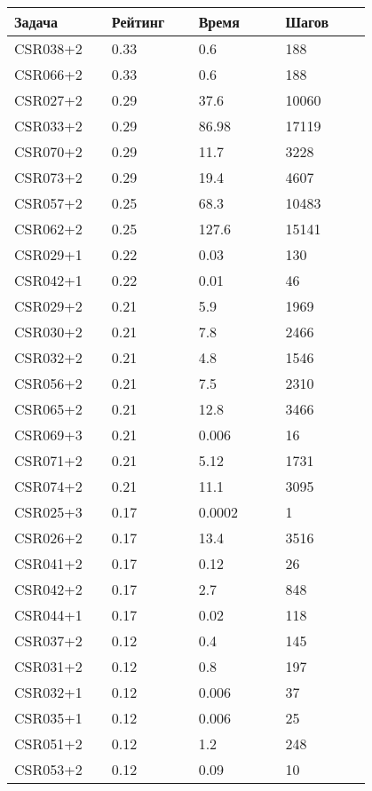 \begin{longtable}[H]{|p{0.2\linewidth}|p{0.2\linewidth}|p{0.2\linewidth}|p{0.2\linewidth}|}
\hline
\textbf{Задача} & \textbf{Рейтинг} & \textbf{Время} & \textbf{Шагов} \\
\hline
CSR038+2 &  0.33 &  0.6 &  188 \\
\hline
CSR066+2 &  0.33 &  0.6 &  188 \\
\hline
CSR027+2 &  0.29 &  37.6 &  10060 \\
\hline
CSR033+2 &  0.29 &  86.98 &  17119 \\
\hline
CSR070+2 &  0.29 &  11.7 &  3228 \\
\hline
CSR073+2 &  0.29 &  19.4 &  4607 \\
\hline
CSR057+2 &  0.25 &  68.3 &  10483 \\
\hline
CSR062+2 &  0.25 &  127.6 &  15141 \\
\hline
CSR029+1 &  0.22 &  0.03 &  130 \\
\hline
CSR042+1 &  0.22 &  0.01 &  46 \\
\hline
CSR029+2 &  0.21 &  5.9 &  1969 \\
\hline
CSR030+2 &  0.21 &  7.8 &  2466 \\
\hline
CSR032+2 &  0.21 &  4.8 &  1546 \\
\hline
CSR056+2 &  0.21 &  7.5 &  2310 \\
\hline
CSR065+2 &  0.21 &  12.8 &  3466 \\
\hline
CSR069+3 &  0.21 &   0.006 &  16 \\
\hline
CSR071+2 &  0.21 &  5.12 &  1731 \\
\hline
CSR074+2 &  0.21 &  11.1 &  3095 \\
\hline
CSR025+3 &  0.17 &  0.0002 &  1 \\
\hline
CSR026+2 &  0.17 &  13.4 &  3516 \\
\hline
CSR041+2 &  0.17 &  0.12 &  26 \\
\hline
CSR042+2 &  0.17 &  2.7 &  848 \\
\hline
CSR044+1 &  0.17 &  0.02 &  118 \\
\hline
CSR037+2 &  0.12 &  0.4 &  145 \\
\hline
CSR031+2 &  0.12 &  0.8 &  197 \\
\hline
CSR032+1 &  0.12 &  0.006 &  37 \\
\hline
CSR035+1 &  0.12 &  0.006 &  25 \\
\hline
CSR051+2 &  0.12 &  1.2 &  248 \\
\hline
CSR053+2 &  0.12 &  0.09 &  10 \\

\end{longtable}
